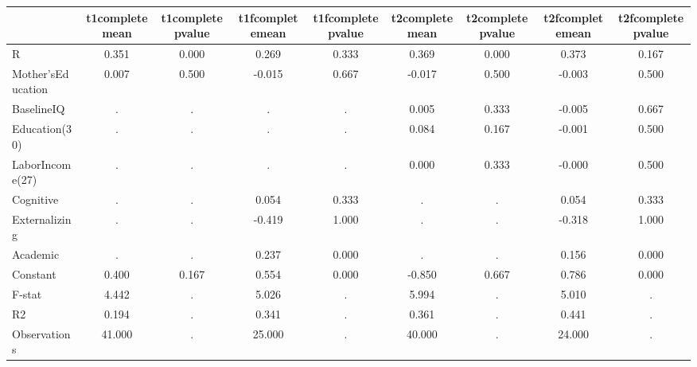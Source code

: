 \begin{table}[htbp]
\begin{tabular}{lcccccccc} \hline \hline
 & t1completemean  & t1completepvalue  & t1fcompletemean  & t1fcompletepvalue  & t2completemean  & t2completepvalue  & t2fcompletemean  & t2fcompletepvalue  \\  \hline 
R &     0.351 &     0.000 &     0.269 &     0.333 &     0.369 &     0.000 &     0.373 &     0.167 \\  
Mother'sEducation &     0.007 &     0.500 &    -0.015 &     0.667 &    -0.017 &     0.500 &    -0.003 &     0.500 \\  
BaselineIQ &         . &         . &         . &         . &     0.005 &     0.333 &    -0.005 &     0.667 \\  
Education(30) &         . &         . &         . &         . &     0.084 &     0.167 &    -0.001 &     0.500 \\  
LaborIncome(27) &         . &         . &         . &         . &     0.000 &     0.333 &    -0.000 &     0.500 \\  
Cognitive &         . &         . &     0.054 &     0.333 &         . &         . &     0.054 &     0.333 \\  
Externalizing &         . &         . &    -0.419 &     1.000 &         . &         . &    -0.318 &     1.000 \\  
Academic &         . &         . &     0.237 &     0.000 &         . &         . &     0.156 &     0.000 \\  
Constant &     0.400 &     0.167 &     0.554 &     0.000 &    -0.850 &     0.667 &     0.786 &     0.000 \\  
F-stat &     4.442 &         . &     5.026 &         . &     5.994 &         . &     5.010 &         . \\  
R2 &     0.194 &         . &     0.341 &         . &     0.361 &         . &     0.441 &         . \\  
Observations &    41.000 &         . &    25.000 &         . &    40.000 &         . &    24.000 &         . \\  
\hline \hline \end{tabular}
\end{table}
